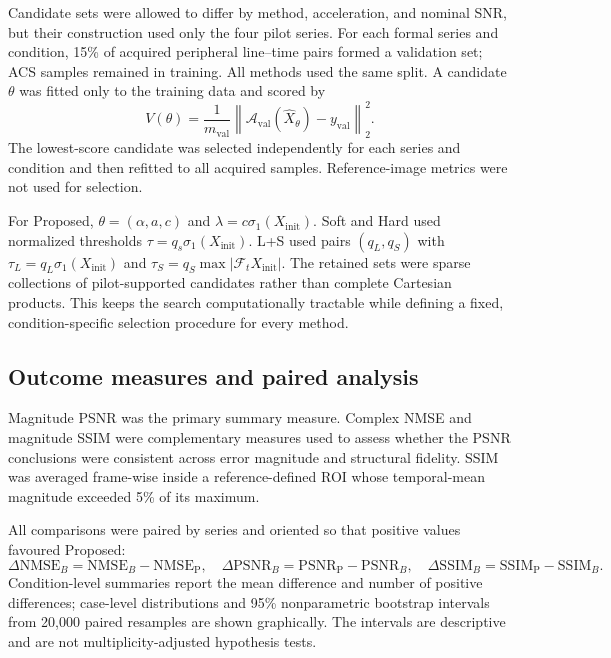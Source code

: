 Candidate sets were allowed to differ by method, acceleration, and nominal SNR, but their construction used only the four pilot series. For each formal series and condition, 15\% of acquired peripheral line--time pairs formed a validation set; ACS samples remained in training. All methods used the same split. A candidate $\theta$ was fitted only to the training data and scored by
\begin{equation}
  V(\theta)=\frac{1}{m_{\mathrm{val}}}
  \left\lVert\mathcal A_{\mathrm{val}}(\widehat X_\theta)
  -y_{\mathrm{val}}\right\rVert_2^2.
  \label{eq:validation_score}
\end{equation}
The lowest-score candidate was selected independently for each series and condition and then refitted to all acquired samples. Reference-image metrics were not used for selection.

For Proposed, $\theta=(\alpha,a,c)$ and $\lambda=c\sigma_1(X_{\mathrm{init}})$. Soft and Hard used normalized thresholds $\tau=q_s\sigma_1(X_{\mathrm{init}})$. L+S used pairs $(q_L,q_S)$ with $\tau_L=q_L\sigma_1(X_{\mathrm{init}})$ and $\tau_S=q_S\max|\mathcal F_tX_{\mathrm{init}}|$. The retained sets were sparse collections of pilot-supported candidates rather than complete Cartesian products. This keeps the search computationally tractable while defining a fixed, condition-specific selection procedure for every method.

\subsection{Outcome measures and paired analysis}
\label{sec:evaluation_metrics}

Magnitude PSNR was the primary summary measure. Complex NMSE and magnitude SSIM were complementary measures used to assess whether the PSNR conclusions were consistent across error magnitude and structural fidelity. SSIM was averaged frame-wise inside a reference-defined ROI whose temporal-mean magnitude exceeded 5\% of its maximum.

All comparisons were paired by series and oriented so that positive values favoured Proposed:
\begin{equation}
  \Delta\mathrm{NMSE}_B=\mathrm{NMSE}_B-\mathrm{NMSE}_{\mathrm{P}},
  \quad
  \Delta\mathrm{PSNR}_B=\mathrm{PSNR}_{\mathrm{P}}-\mathrm{PSNR}_B,
  \quad
  \Delta\mathrm{SSIM}_B=\mathrm{SSIM}_{\mathrm{P}}-\mathrm{SSIM}_B.
  \label{eq:paired_differences}
\end{equation}
Condition-level summaries report the mean difference and number of positive differences; case-level distributions and 95\% nonparametric bootstrap intervals from 20,000 paired resamples are shown graphically. The intervals are descriptive and are not multiplicity-adjusted hypothesis tests.

